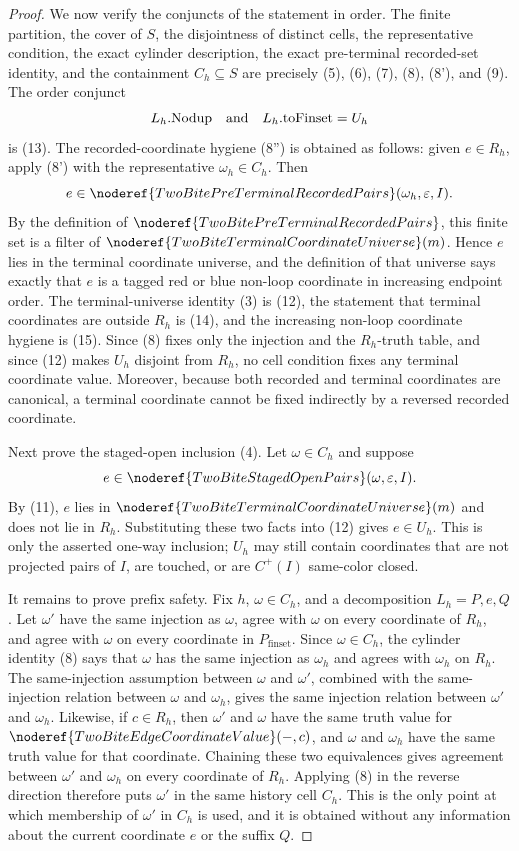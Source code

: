 \begin{proof}
We now verify the conjuncts of the statement in order.  The finite partition,
the cover of \(S\), the disjointness of distinct cells, the representative
condition, the exact cylinder description, the exact pre-terminal recorded-set
identity, and the containment \(C_h\subseteq S\) are precisely (5), (6), (7),
(8), (8'), and (9).  The order
conjunct
\[
L_h.\mathrm{Nodup}\quad\hbox{and}\quad L_h.\mathrm{toFinset}=U_h
\]
is (13).  The recorded-coordinate hygiene (8'') is obtained as follows:
given \(e\in R_h\), apply (8') with the representative
\(\omega_h\in C_h\).  Then
\[
e\in\noderef{TwoBitePreTerminalRecordedPairs}
(\omega_h,\varepsilon,I).
\]
By the definition of \(\noderef{TwoBitePreTerminalRecordedPairs}\), this
finite set is a filter of
\(\noderef{TwoBiteTerminalCoordinateUniverse}(m)\).  Hence \(e\) lies in the
terminal coordinate universe, and the definition of that universe says
exactly that \(e\) is a tagged red or blue non-loop coordinate in increasing
endpoint order.  The terminal-universe identity (3) is (12), the statement
that terminal coordinates are outside \(R_h\) is (14), and the increasing
non-loop coordinate hygiene is (15).  Since (8) fixes only the injection and
the \(R_h\)-truth table, and since (12) makes \(U_h\) disjoint from \(R_h\),
no cell condition fixes any terminal coordinate value.  Moreover, because
both recorded and terminal coordinates are canonical, a terminal coordinate
cannot be fixed indirectly by a reversed recorded coordinate.

Next prove the staged-open inclusion (4).  Let \(\omega\in C_h\) and
suppose
\[
e\in\noderef{TwoBiteStagedOpenPairs}(\omega,\varepsilon,I).
\]
By (11), \(e\) lies in
\(\noderef{TwoBiteTerminalCoordinateUniverse}(m)\) and does not lie in
\(R_h\).  Substituting these two facts into (12) gives \(e\in U_h\).  This is
only the asserted one-way inclusion; \(U_h\) may still contain coordinates
that are not projected pairs of \(I\), are touched, or are
\(C^+(I)\) same-color closed.

It remains to prove prefix safety.  Fix \(h\), \(\omega\in C_h\), and a
decomposition \(L_h=P,e,Q\).  Let \(\omega'\) have the same injection as
\(\omega\), agree with \(\omega\) on every coordinate of \(R_h\), and agree
with \(\omega\) on every coordinate in \(P_{\mathrm{finset}}\).  Since
\(\omega\in C_h\), the cylinder identity (8) says that \(\omega\) has the
same injection as \(\omega_h\) and agrees with \(\omega_h\) on \(R_h\).  The
same-injection assumption between \(\omega\) and \(\omega'\), combined with
the same-injection relation between \(\omega\) and \(\omega_h\), gives the
same injection relation between \(\omega'\) and \(\omega_h\).  Likewise, if
\(c\in R_h\), then \(\omega'\) and \(\omega\) have the same truth value for
\(\noderef{TwoBiteEdgeCoordinateValue}(-,c)\), and \(\omega\) and
\(\omega_h\) have the same truth value for that coordinate.  Chaining these
two equivalences gives agreement between \(\omega'\) and \(\omega_h\) on
every coordinate of \(R_h\).  Applying (8) in the reverse direction therefore
puts \(\omega'\) in the same history cell \(C_h\).  This is the only point at
which membership of \(\omega'\) in \(C_h\) is used, and it is obtained without
any information about the current coordinate \(e\) or the suffix \(Q\).


\end{proof}
